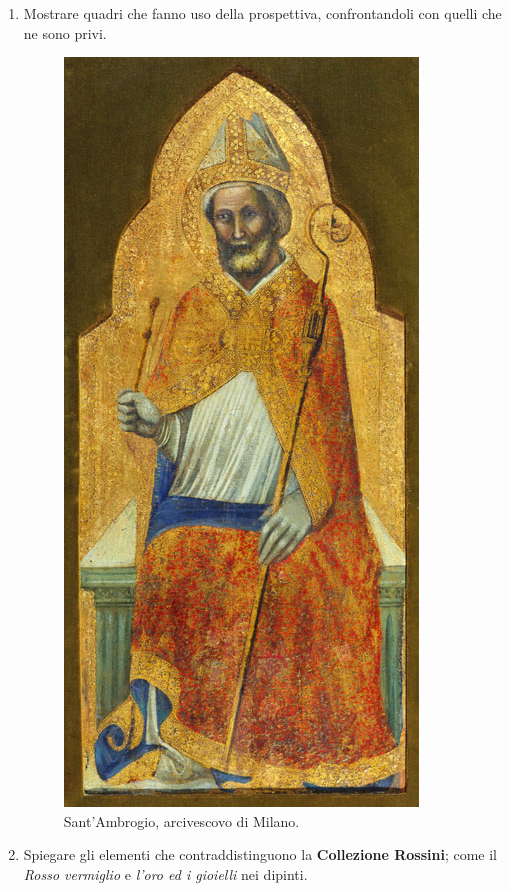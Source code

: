 \documentclass[12pt,a4paper]{article}
\begin{document}
\begin{enumerate}
	\item Mostrare quadri che fanno uso della prospettiva, confrontandoli con quelli che ne sono privi.  
	\begin{figure}[h!]
		\centering
		\includegraphics[scale=0.5]{SanAmbrogio.jpg}
		\caption{Sant'Ambrogio, arcivescovo di Milano.}
	\end{figure}
	
	\item Spiegare gli elementi che contraddistinguono la \textbf{Collezione Rossini}; come il \textit{Rosso vermiglio} e \textit{l'oro ed i gioielli} nei dipinti.
	

\end{enumerate}
\end{document}
